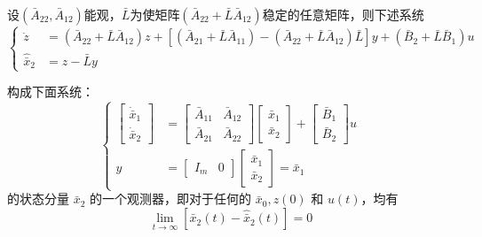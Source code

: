 \begin{lemma}
    设$(\bar{A}_{22},\bar{A}_{12})$能观，$\bar{L}$为使矩阵$(\bar{A}_{22} + \bar{L}\bar{A}_{12})$稳定的任意矩阵，则下述系统
    \[
    \left\{
    \begin{aligned}
    \dot{z}
    &=
    (\bar{A}_{22}+\bar{L}\bar{A}_{12})z
    +
    \left[
    (\bar{A}_{21}+\bar{L}\bar{A}_{11})
    -
    (\bar{A}_{22}+\bar{L}\bar{A}_{12})\bar{L}
    \right]y
    +
    (\bar{B}_2+\bar{L}\bar{B}_1)u
    \\
    \hat{\bar{x}}_2
    &=
    z-\bar{L}y
    \end{aligned}
    \right.
    \]

    构成下面系统：
    \[
    \left\{
    \begin{aligned}
    \begin{bmatrix}
    \dot{\bar{x}}_1\\
    \dot{\bar{x}}_2
    \end{bmatrix}
    &=
    \begin{bmatrix}
    \bar{A}_{11} & \bar{A}_{12}\\
    \bar{A}_{21} & \bar{A}_{22}
    \end{bmatrix}
    \begin{bmatrix}
    \bar{x}_1\\
    \bar{x}_2
    \end{bmatrix}
    +
    \begin{bmatrix}
    \bar{B}_1\\
    \bar{B}_2
    \end{bmatrix}u
    \\
    y
    &=
    \begin{bmatrix}
    I_m & 0
    \end{bmatrix}
    \begin{bmatrix}
    \bar{x}_1\\
    \bar{x}_2
    \end{bmatrix}
    =
    \bar{x}_1
    \end{aligned}
    \right.
    \]
    的状态分量 $\bar{x}_2$ 的一个观测器，即对于任何的
    $\bar{x}_0,z(0)$ 和 $u(t)$，均有
    \[
    \lim_{t\to\infty}\left[\bar{x}_2(t)-\hat{\bar{x}}_2(t)\right]=0
    \]
\end{lemma}

